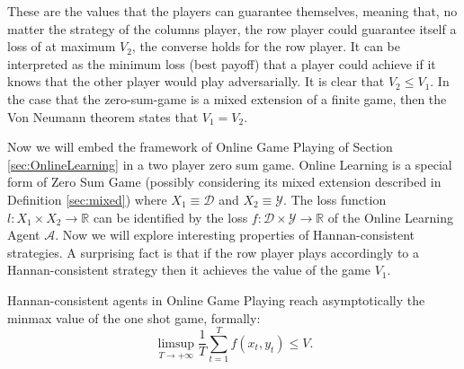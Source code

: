 These are the values that the players can guarantee themselves, meaning that, no matter the strategy of the columns player, the row player could guarantee itself a loss of at maximum $V_2$, the converse holds for the row player. It can be interpreted as the minimum loss (best payoff) that a player could achieve if it knows that the other player would play adversarially. It is clear that $V_2\le V_1$. In the case that the zero-sum-game is a mixed extension of a finite game, then the Von Neumann theorem states that $V_1=V_2$.
 
Now we will embed the framework of Online Game Playing of Section \ref{sec:OnlineLearning} in a two player zero sum game. 
Online Learning is a special form of Zero Sum Game (possibly considering its mixed extension described in Definition \ref{sec:mixed}) where $X_1\equiv \mathcal D$ and $X_2\equiv \mathcal Y$. The loss function $l:X_1\times X_2\to\mathbb R$ can be identified by the loss $f:\mathcal D\times \mathcal Y\to\mathbb R$ of the Online Learning Agent $\mathcal A$.
Now we will explore interesting properties of Hannan-consistent strategies. A surprising fact is that if the row player plays accordingly to a Hannan-consistent strategy then it achieves the value of the game $V_1$. 

\begin{theorem}
    Hannan-consistent agents in Online Game Playing reach asymptotically the minmax value of the one shot game, formally:
    $$\limsup\limits_{T\to +\infty}\frac{1}{T}\sum\limits_{t=1}^Tf(x_t,y_t)\le V.$$
\end{theorem}

